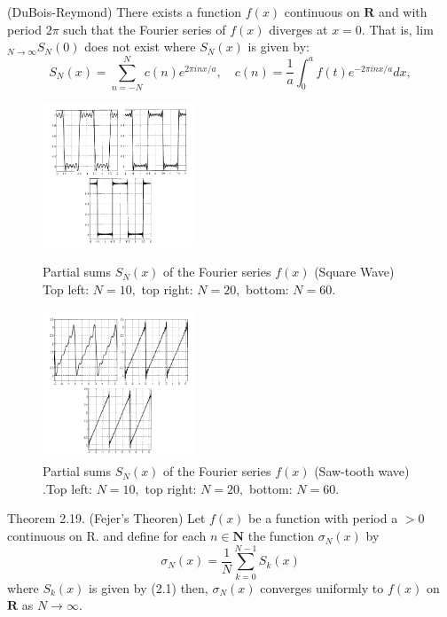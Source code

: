 \begin{theorem}
(DuBois-Reymond) There exists a function $f(x)$ continuous on $\mathbf{R}$ and with period $2 \pi$ such that the Fourier series of $f(x)$ diverges at $x=0$.
That is, lim $_{N \rightarrow \infty} S_{N}(0)$ does not exist where $S_{N}(x)$ is given by:
$$
S_{N}(x)=\sum_{n=-N}^{N} c(n) e^{2 \pi i n x / a}, \quad c(n)=\frac{1}{a} \int_{0}^{a} f(t) e^{-2 \pi i n x / a} d x,
$$
\end{theorem}

\begin{figure}[ht]
    \centering
    \includegraphics[width=0.4\textwidth]{sections/Gibbs.PNG}
    \caption{Partial sums $S_{N}(x)$ of the Fourier series $f(x)$ (Square Wave) Top left: $N=10,$ top right: $N=20,$ bottom: $N=60 .$}
    \includegraphics[width=0.4\textwidth]{sections/Gibbs0.PNG}
    \caption{Partial sums $S_{N}(x)$ of the Fourier series $f(x)$ (Saw-tooth wave) .Top left: $N=10,$ top right: $N=20,$ bottom: $N=60 .$}
    \label{fig:Gibbs}
\end{figure}


\begin{theorem}
Theorem 2.19. (Fejer's Theoren) Let $f(x)$ be a function with period a $>0$
continuous on R. and define for each $n \in \mathbf{N}$ the function $\sigma_{N}(x)$ by
$$
\sigma_{N}(x)=\frac{1}{N} \sum_{k=0}^{N-1} S_{k}(x)
$$
where $S_{k }(x)$ is given by (2.1) then,  $ \sigma_{N}(x) $ converges uniformly to $f(x)$ on $\mathbf{R}$ as $N \rightarrow \infty$.
\end{theorem}



